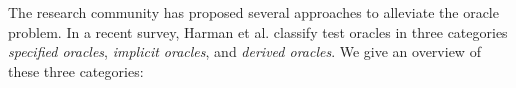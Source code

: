 


The research community has proposed several approaches\cite{harman2013comprehensive,barr2015oracle} to alleviate the oracle problem. 
In a recent survey, Harman et al.\cite{harman2013comprehensive} classify test oracles in three categories \textit{specified oracles}, \textit{implicit oracles}, and \textit{derived oracles}. We give an overview of these three categories:
